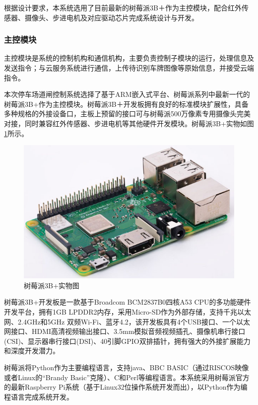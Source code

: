 根据设计要求，本系统选用了目前最新的树莓派3B＋作为主控模块，配合红外传感器、摄像头、步进电机及对应驱动芯片完成系统设计与开发。

\subsubsection{主控模块}
主控模块是系统的控制机构和通信机构，主要负责控制子模块的运行，处理信息及发送指令；与云服务系统进行通信，上传待识别车牌图像等原始信息，并接受云端指令。

本次停车场道闸控制系统选择了基于ARM嵌入式平台、树莓派系列中最新一代的树莓派3B+作为主控模块。树莓派3B＋开发板拥有良好的标准模块扩展性，具备多种规格的外接设备口，主板上预留的接口可与树莓派500万像素专用摄像头完美对接，同时兼容红外传感器、步进电机等其他硬件开发模块。树莓派3B+实物如图\ref{fig:树莓派3B+实物图}所示。

\begin{figure}[htbp]
	\centering
	\includegraphics[width=\textwidth]{figure/hardware-RPI3B.jpg}
	\caption{树莓派3B+实物图}\label{fig:树莓派3B+实物图}
\end{figure}

树莓派3B+开发板是一款基于Broadcom BCM2837B0四核A53 CPU的多功能硬件开发平台，拥有1GB LPDDR2内存，采用Micro-SD作为外部存储，支持千兆以太网、2.4GHz和5GHz 双频Wi-Fi、蓝牙4.2，该开发板具有4个USB接口、一个以太网接口、HDMI高清视频输出接口、3.5mm模拟音频视频插孔、摄像机串行接口(CSI)、显示器串行接口(DSI)、40引脚GPIO双排插针，拥有强大的外接扩展能力和深度开发潜力。

树莓派将Python作为主要编程语言，支持java、BBC BASIC（通过RISCOS映像或者Linux的“Brandy Basic”克隆）、C和Perl等编程语言。本系统采用树莓派官方的最新Raspberry Pi系统（基于Linux32位操作系统开发而出），以Python作为编程语言完成系统开发。

